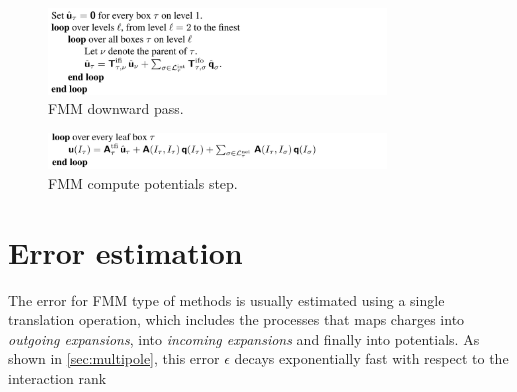 \documentclass[final,onefignum,onetabnum]{siamart220329}
\begin{document}
\begin{figure}[h!]
	\centering
	\includegraphics[width=0.8\textwidth]{downfmm}
	\caption{FMM downward pass.}
	\label{fig:downfmm}
\end{figure}
\begin{figure}[h!]
	\centering
	\includegraphics[width=0.8\textwidth]{potfmm}
	\caption{FMM compute potentials step.}
	\label{fig:potfmm}
\end{figure}

\section{Error estimation}
The error for FMM type of methods is usually estimated using a single translation operation, which includes the processes that maps charges into \textit{outgoing expansions}, into \textit{incoming expansions} and finally into potentials. As shown in \cref{sec:multipole}, this error $\epsilon$ decays exponentially fast with respect to the interaction rank  




\end{document}

